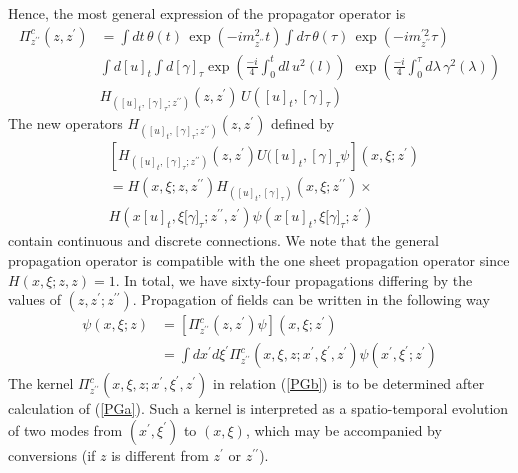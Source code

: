\documentclass[12pt,a4paper]{article}
\begin{document}
Hence, the most general expression of the propagator operator is
\begin{align}
\Pi_{z^{\prime\prime}}^{c}\left(  z,z^{\prime}\right)   & =\int dt\,\theta
(t)\,\exp(-im_{z^{\prime\prime}}^{2}t)\int d\tau\,\theta(\tau)\,\exp
(-im_{z^{\prime\prime}}^{\prime2}\tau)\\
& \int d[u]_{t}\int d[\gamma]_{\tau}\exp(\frac{-i}{4}\int_{0}^{t}%
dl\,u^{2}(l))\,\,\exp(\frac{-i}{4}\int_{0}^{\tau}d\lambda\,\gamma^{2}%
(\lambda))\nonumber\\
& H_{([u]_{t},[\gamma]_{\tau};z^{\prime\prime})}\left(  z,z^{\prime}\right)
\,U([u]_{t},[\gamma]_{\tau})\nonumber
\end{align}
The new operators $H_{([u]_{t},[\gamma]_{\tau};z^{\prime\prime})}\left(
z,z^{\prime}\right)  $ defined by
\begin{align}
& \left[  H_{([u]_{t},[\gamma]_{\tau};z^{\prime\prime})}\left(  z,z^{\prime
}\right)  U([u]_{t},[\gamma]_{\tau}\psi\right]  (x,\xi;z^{\prime
})\,\nonumber\\
& =H\left(  x,\xi;z,z^{\prime\prime}\right)  H_{([u]_{t},[\gamma]_{\tau}%
)}(x,\xi;z^{\prime\prime})\times\\
& H(x[u]_{t},\xi\lbrack\gamma]_{\tau};z^{\prime\prime},z^{\prime}%
)\psi(x[u]_{t},\xi\lbrack\gamma]_{\tau};z^{\prime})\nonumber
\end{align}
contain continuous and discrete connections. We note that the general
propagation operator is compatible with the one sheet propagation operator
since $H(x,\xi;z,z)=1$. In total, we have sixty-four propagations differing by
the values of $\left(  z,z^{\prime};z^{\prime\prime}\right)  $. Propagation of
fields can be written in the following way
\begin{align}
\psi(x,\xi;z)  & =[\Pi_{z^{\prime\prime}}^{c}\left(  z,z^{\prime}\right)
\psi](x,\xi;z^{\prime})\label{PGa}\\
& =\int dx^{\prime}d\xi^{\prime}\Pi_{z^{\prime\prime}}^{c}\left(
x,\xi,z;x^{\prime},\xi^{\prime},z^{\prime}\right)  \psi(x^{\prime},\xi
^{\prime};z^{\prime})\label{PGb}%
\end{align}
The kernel $\Pi_{z^{\prime\prime}}^{c}\left(  x,\xi,z;x^{\prime},\xi^{\prime
},z^{\prime}\right)  $ in relation (\ref{PGb}) is to be determined after
calculation of (\ref{PGa}). Such a kernel is interpreted as a spatio-temporal
evolution of two modes from $\left(  x^{\prime},\xi^{\prime}\right)  $ to
$\left(  x,\xi\right)  $, which may be accompanied by conversions (if $z$ is
different from $z^{\prime}$ or $z^{\prime\prime}$).
\end{document}
